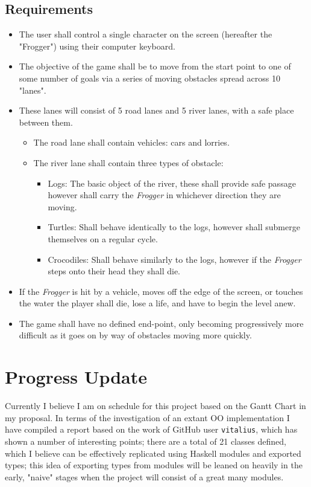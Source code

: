 \documentclass[12pt, a4paper]{report}
\begin{document}
\subsection{Requirements}
\begin{itemize}
  \item The user shall control a single character on the screen (hereafter the "Frogger") using their computer keyboard.
  \item The objective of the game shall be to move from the start point to one of some number of goals via a series of moving obstacles spread across 10 "lanes".
  \item These lanes will consist of 5 road lanes and 5 river lanes, with a safe place between them.
    \begin{itemize}
      \item The road lane shall contain vehicles: cars and lorries.
      \item The river lane shall contain three types of obstacle:
        \begin{itemize}
          \item Logs: The basic object of the river, these shall provide safe passage however shall carry the \textit{Frogger} in whichever direction they are moving.
          \item Turtles: Shall behave identically to the logs, however shall submerge themselves on a regular cycle.
          \item Crocodiles: Shall behave similarly to the logs, however if the \textit{Frogger} steps onto their head they shall die.
        \end{itemize}
    \end{itemize}
  \item If the \textit{Frogger} is hit by a vehicle, moves off the edge of the screen, or touches the water the player shall die, lose a life, and have to begin the level anew.
  \item The game shall have no defined end-point, only becoming progressively more difficult as it goes on by way of obstacles moving more quickly.
\end{itemize}

\section{Progress Update}
Currently I believe I am on schedule for this project based on the Gantt Chart in my proposal.
In terms of the investigation of an extant OO implementation I have compiled a report based on the work of GitHub user \verb|vitalius|, which has shown a number of interesting points; there are a total of 21 classes defined, which I believe can be effectively replicated using Haskell modules and exported types; this idea of exporting types from modules will be leaned on heavily in the early, "naive" stages when the project will consist of a great many modules.
\end{document}
